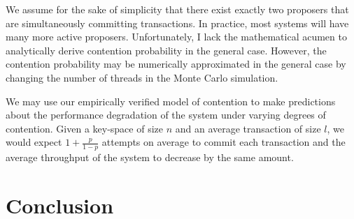 \documentclass[../main.tex]{subfiles}
\begin{document}
  We assume for the sake of simplicity that there exist exactly two proposers that are
  simultaneously committing transactions. In practice, most systems will have many more active
  proposers. Unfortunately, I lack the mathematical acumen to analytically derive contention
  probability in the general case. However, the contention probability may be numerically
  approximated in the general case by changing the number of threads in the Monte Carlo simulation.

  We may use our empirically verified model of contention to make predictions about the performance
  degradation of the system under varying degrees of contention. Given a key-space of size $n$ and
  an average transaction of size $l$, we would expect $1 + \frac{p}{1 - p}$ attempts on average to
  commit each transaction and the average throughput of the system to decrease by the same amount.

\section{Conclusion}
\end{document}
